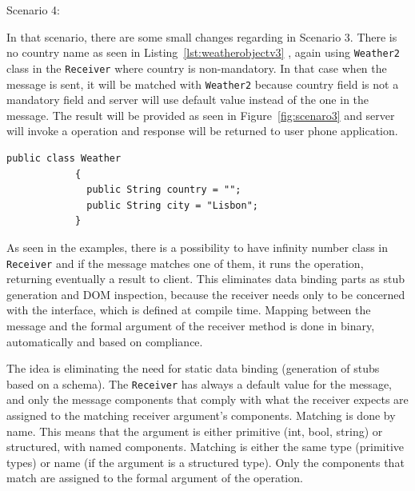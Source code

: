 Scenario 4:

In that scenario, there are some small changes regarding in Scenario 3. There is no country name as seen in Listing~\ref{lst:weatherobjectv3} , again using {\tt Weather2} class in the {\tt Receiver} where country is non-mandatory. In that case when the message is sent, it will be matched with {\tt Weather2} because country field is not a mandatory field and server will use default value instead of the one in the message. The result will be provided as seen in Figure~\ref{fig:scenaro3} and server will invoke a operation and response will be returned to user phone application.

\begin{lstlisting}[caption=Simple weather object class for Scenario 4, label=lst:weatherobjectv3]
          public class Weather
            {
              public String country = "";
              public String city = "Lisbon";
            }

\end{lstlisting}

As seen in the examples, there is a possibility to have infinity number class in {\tt Receiver} and if the message matches one of them, it runs the operation, returning eventually a result to client. This eliminates data binding parts as stub generation and DOM inspection, because the receiver needs only to be concerned with the interface, which is defined at compile time. Mapping between the message and the formal argument of the receiver method is done in binary, automatically and based on compliance.

The idea is eliminating the need for static data binding (generation of stubs based on a schema). The {\tt Receiver} has always a default value for the message, and only the message components that comply with what the receiver expects are assigned to the matching receiver argument's components. Matching is done by name. This means that the argument is either primitive (int, bool, string) or structured, with named components. Matching is either the same type (primitive types) or name (if the argument is a structured type). Only the components that match are assigned to the formal argument of the operation.

